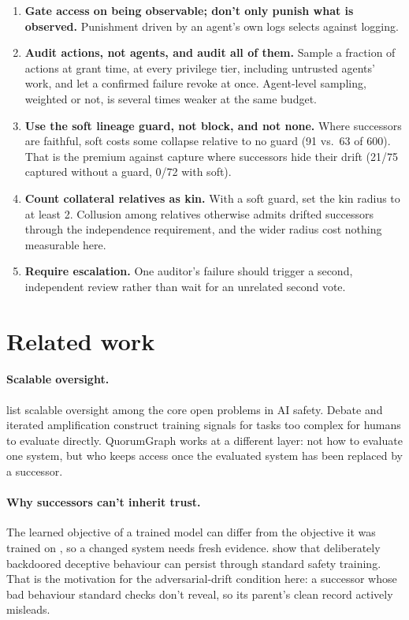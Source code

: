 \documentclass[11pt]{article}
\begin{document}
\begin{enumerate}
  \item \textbf{Gate access on being observable; don't only punish what is observed.}
  Punishment driven by an agent's own logs selects against logging.
  \item \textbf{Audit actions, not agents, and audit all of them.} Sample a fraction of
  actions at grant time, at every privilege tier, including untrusted agents' work, and let a
  confirmed failure revoke at once. Agent-level sampling, weighted or not, is several times
  weaker at the same budget.
  \item \textbf{Use the soft lineage guard, not block, and not none.} Where successors are
  faithful, soft costs some collapse relative to no guard (91 vs.\ 63 of 600). That is the
  premium against capture where successors hide their drift (21/75 captured without a guard,
  0/72 with soft).
  \item \textbf{Count collateral relatives as kin.} With a soft guard, set the kin radius to
  at least 2. Collusion among relatives otherwise admits drifted successors through the independence
  requirement, and the wider radius cost nothing measurable here.
  \item \textbf{Require escalation.} One auditor's failure should trigger a second,
  independent review rather than wait for an unrelated second vote.
\end{enumerate}

\section{Related work}

\paragraph{Scalable oversight.} \citet{amodei2016concrete} list scalable oversight among the
core open problems in AI safety. Debate \citep{irving2018debate} and iterated amplification
\citep{christiano2018amplification} construct training signals for tasks too complex for
humans to evaluate directly. QuorumGraph works at a different layer: not how to evaluate one
system, but who keeps access once the evaluated system has been replaced by a successor.

\paragraph{Why successors can't inherit trust.} The learned objective of a trained model can
differ from the objective it was trained on \citep{hubinger2019risks}, so a changed system
needs fresh evidence. \citet{hubinger2024sleeper} show that deliberately backdoored deceptive
behaviour can persist through standard safety training. That is the motivation for the
adversarial-drift condition here: a successor whose bad behaviour standard checks don't
reveal, so its parent's clean record actively misleads.
\end{document}

